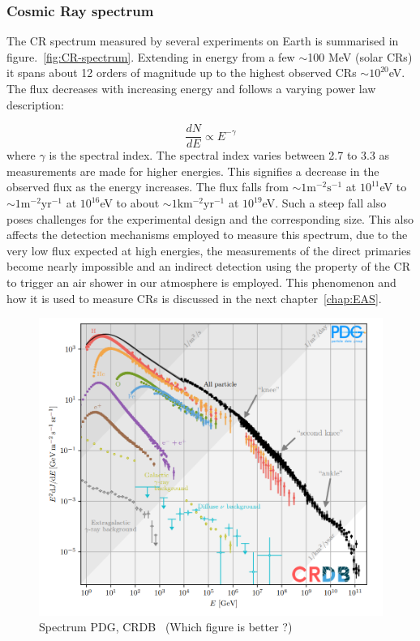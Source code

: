 \subsubsection*{Cosmic Ray spectrum}
\label{subsubsec:CRspectrum}
The \gls{CR} spectrum measured by several experiments on Earth is summarised in figure.~\ref{fig:CR-spectrum}. Extending in energy from a few $\sim$100 MeV (solar \glspl{CR}) it spans about 12 orders of magnitude up to the highest observed \glspl{CR} $\sim 10^{20}$eV. The flux decreases with increasing energy and follows a varying power law description:

\begin{equation}
  \label{eq:Powlaw}
  \frac{dN}{dE} \propto E^{-\gamma}   
\end{equation}
where $\gamma$ is the spectral index. The spectral index varies between 2.7 to 3.3 as measurements are made for higher energies. This signifies a decrease in the observed flux as the energy increases. The flux falls from $\mathrm{\sim 1m^{-2} s^{-1}}$ at $10^{11}$eV to $\mathrm{\sim 1m^{-2} yr^{-1}}$ at $10^{16}$eV to about $\mathrm{\sim 1km^{-2} yr^{-1}}$ at $10^{19}$eV. Such a steep fall also poses challenges for the experimental design and the corresponding size. This also affects the detection mechanisms employed to measure this spectrum, due to the very low flux expected at high energies, the measurements of the direct primaries become nearly impossible and an indirect detection using the property of the \gls{CR} to trigger an air shower in our atmosphere is employed. This phenomenon and how it is used to measure \glspl{CR} is discussed in the next chapter~\ref{chap:EAS}.

\begin{figure}[t!]
  \centering
  \includegraphics[width=14.5cm]{thesis_figures/CRnNu/CR-spectrum.png}
  \caption{Spectrum PDG, CRDB~\cite{ParticleDataGroup:2024cfk} (Which figure is better ?)}
  \label{fig:CR-spectrum_scaled}
\end{figure}

